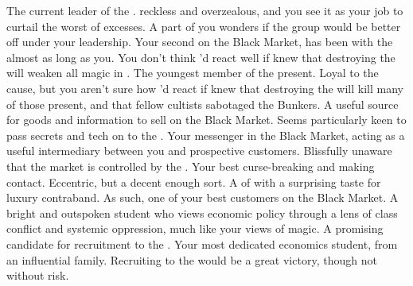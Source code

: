 \documentclass[char]{GL2020}
\begin{document}
\begin{contacts}
    \contact{\cChupLeader{}} The current leader of the \pGoaties{}. \cChupLeader{\Theyare} reckless and overzealous, and you see it as your job to curtail the worst of \cChupLeader{\their} excesses. A part of you wonders if the group would be better off under your leadership.
    \contact{\cChupInventor{}} Your second on the Black Market, \cChupInventor{} has been with the \pGoaties{} almost as long as you. You don't think \cChupInventor{\they}'d react well if  \cChupInventor{\they} knew that destroying the \pSc{} will weaken all magic in \pEarth{}.
    \contact{\cChupStudent{}} The youngest member of the \pGoaties{} present. Loyal to the cause, but you aren't sure how \cChupStudent{\they}'d react if \cChupStudent{\they} knew that destroying the \pSc{} will kill many of those present, and that \cChupStudent{\their} fellow cultists sabotaged the Bunkers.
    \contact{\cEthics{}} A useful source for goods and information to sell on the Black Market. Seems particularly keen to pass secrets and tech on to the \pShip{}.
    \contact{\cLibAssist{}} Your messenger in the Black Market, acting as a useful intermediary between you and prospective customers. Blissfully unaware that the market is controlled by the \pGoaties{}.
    \contact{\cCurse{}} Your best curse-breaking and making contact. Eccentric, but a decent enough sort.
    \contact{\cHedonist{}} A \cHedonist{\cleric} of \cFarmGod{} with a surprising taste for luxury contraband. As such, one of your best customers on the Black Market.
    \contact{\cPirateChild{\full}} A bright and outspoken \pShippie{} student who views economic policy through a lens of class conflict and systemic oppression, much like your views of magic. A promising candidate for recruitment to the \pGoaties{}.
     \contact{\cPresident{}} Your most dedicated economics student, from an influential \pShippie{} family. Recruiting \cPresident{\them} to the \pGoaties{} would be a great victory, though not without risk.
\end{contacts}
\end{document}
